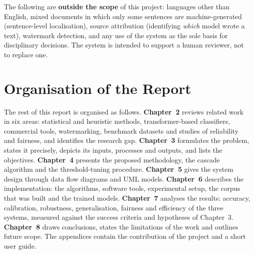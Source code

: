 The following are \textbf{outside the scope} of this project: languages other than
English, mixed documents in which only some sentences are machine-generated
(sentence-level localisation), source attribution (identifying \emph{which}
model wrote a text), watermark detection, and any use of the system as the sole
basis for disciplinary decisions. The system is intended to support a human
reviewer, not to replace one.

\section{Organisation of the Report}

The rest of this report is organised as follows.
\textbf{Chapter~2} reviews related work in six areas: statistical and heuristic
methods, transformer-based classifiers, commercial tools, watermarking,
benchmark datasets and studies of reliability and fairness, and identifies the
research gap. \textbf{Chapter~3} formulates the problem, states it precisely,
depicts its inputs, processes and outputs, and lists the objectives.
\textbf{Chapter~4} presents the proposed methodology, the cascade algorithm and
the threshold-tuning procedure. \textbf{Chapter~5} gives the system design
through data flow diagrams and UML models. \textbf{Chapter~6} describes the
implementation: the algorithms, software tools, experimental setup, the
corpus that was built and the trained models. \textbf{Chapter~7} analyses the
results: accuracy, calibration, robustness, generalisation, fairness and
efficiency of the three systems, measured against the success criteria and
hypotheses of Chapter~3. \textbf{Chapter~8} draws conclusions, states the
limitations of the work and outlines future scope. The appendices contain the
contribution of the project and a short user guide.
